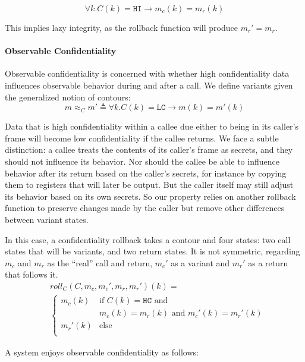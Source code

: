 \documentclass[conference]{IEEEtran}
\begin{document}
      \[\forall k . C(k) = \mathtt{HI} \rightarrow m_c(k) = m_r(k)\]

      This implies lazy integrity, as the rollback function will produce \(m_r' = m_r\).
 
    \paragraph{Observable Confidentiality}

      Observable confidentiality is concerned with whether high confidentiality data influences
      observable behavior during and after a call. We define variants given the generalized notion
      of contours:
      \[m \approx_C m' \triangleq \forall k . C(k) = \mathtt{LC} \rightarrow m(k) = m'(k)\]

      Data that is high confidentiality within a callee due either to being in its caller's frame
      will become low confidentiality if the callee returns. We face a subtle distinction: 
      a callee treats the contents of its caller's frame as secrets, and they should not influence
      its behavior. Nor should the callee be able to influence behavior after its return based
      on the caller's secrets, for instance by copying them to registers that will later be output.
      But the caller itself may still adjust its behavior based on its own secrets. So our property
      relies on another rollback function to preserve changes made by the caller but remove other
      differences between variant states.

      In this case, a confidentiality rollback takes a contour and four states: two call states
      that will be variants, and two return states. It is not symmetric, regarding \(m_c\) and \(m_r\)
      as the ``real'' call and return, \(m_c'\) as a variant and \(m_r'\) as a return that follows it.
      \[\begin{split}
        & \mathit{roll}_C(C,m_c,m_c',m_r,m_r')(k) = \\
        & \begin{cases}
          m_c(k) & \text{if } C(k) = \mathtt{HC} \text{ and } \\
                  & m_c(k) = m_r(k) \text{ and } m_c'(k) = m_r'(k) \\
          m_r'(k) & \text{else} \\
        \end{cases}
      \end{split}\]

      A system enjoys observable confidentiality as follows:
\end{document}
